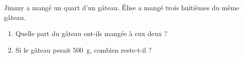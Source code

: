 
\begin{exercice}\label{exosmath-0866}
 
Jimmy a mangé un quart d'un gâteau. Élise a mangé trois huitièmes du même gâteau.  
\begin{enumerate}
    \item
 Quelle part du gâteau ont-ils mangée à eux deux ?
 \item
     Si le gâteau pesait \SI{500}{\gram}, combien reste-t-il ?
\end{enumerate}

\end{exercice}
